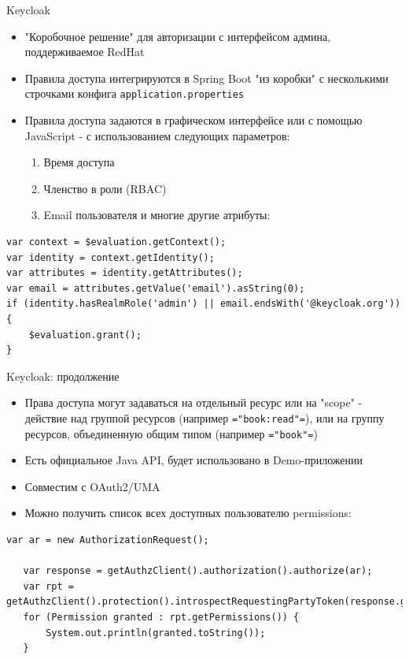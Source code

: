 \documentclass[presentation]{beamer}
\begin{document}
\begin{frame}[label={sec:orge4f4200},fragile]{Keycloak}
 \begin{itemize}
\item "Коробочное решение" для авторизации с интерфейсом админа,  поддерживаемое RedHat
\item Правила доступа интегрируются в Spring Boot "из коробки" с несколькими строчками конфига \texttt{application.properties}
\item Правила доступа задаются в графическом интерфейсе или с помощью JavaScript - с использованием следующих параметров:
\begin{enumerate}
\item Время доступа
\item Членство в роли (RBAC)
\item Email пользователя и многие другие атрибуты:
\end{enumerate}
\end{itemize}
\begin{verbatim}
var context = $evaluation.getContext();
var identity = context.getIdentity();
var attributes = identity.getAttributes();
var email = attributes.getValue('email').asString(0);
if (identity.hasRealmRole('admin') || email.endsWith('@keycloak.org')) {
    $evaluation.grant();
}
\end{verbatim}
\end{frame}

\begin{frame}[label={sec:org6d5a3e8},fragile]{Keycloak: продолжение}
 \begin{itemize}
\item Права доступа могут задаваться на отдельный ресурс или на "scope" - действие над группой ресурсов (например \texttt{="book:read"=}), или на группу ресурсов, объединенную общим типом (например \texttt{="book"=})
\item Есть официальное Java API, будет использовано в Demo-приложении
\item Совместим с OAuth2/UMA
\item Можно получить список всех доступных пользователю permissions:
\end{itemize}
\begin{verbatim}
var ar = new AuthorizationRequest();

   var response = getAuthzClient().authorization().authorize(ar);
   var rpt = getAuthzClient().protection().introspectRequestingPartyToken(response.getToken());
   for (Permission granted : rpt.getPermissions()) {
       System.out.println(granted.toString());
   }

\end{verbatim}
\end{frame}
\end{document}
